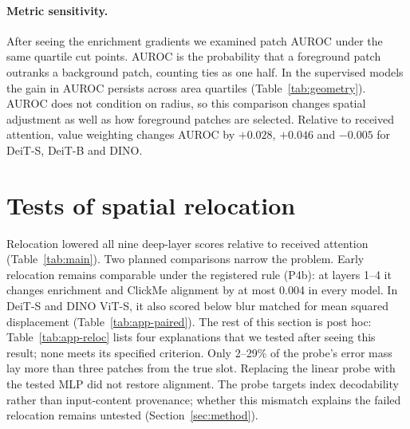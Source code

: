 \paragraph{Metric sensitivity.} After seeing the enrichment gradients we examined patch AUROC under the same quartile cut points. AUROC is the probability that a foreground patch outranks a background patch, counting ties as one half. In the supervised models the gain in AUROC persists across area quartiles (Table~\ref{tab:geometry}). AUROC does not condition on radius, so this comparison changes spatial adjustment as well as how foreground patches are selected. Relative to received attention, value weighting changes AUROC by $+0.028$, $+0.046$ and $-0.005$ for DeiT-S, DeiT-B and DINO.

\begin{center}\begin{minipage}{\linewidth}
\label{tab:geometry}\centering\small
\end{minipage}\end{center}
\clearpage
\section{Tests of spatial relocation}
\label{app:reloc}

Relocation lowered all nine deep-layer scores relative to received attention (Table~\ref{tab:main}). Two planned comparisons narrow the problem. Early relocation remains comparable under the registered rule (P4b): at layers 1--4 it changes enrichment and ClickMe alignment by at most 0.004 in every model. In DeiT-S and DINO ViT-S, it also scored below blur matched for mean squared displacement (Table~\ref{tab:app-paired}). The rest of this section is post hoc: Table~\ref{tab:app-reloc} lists four explanations that we tested after seeing this result; none meets its specified criterion. Only 2--29\% of the probe's error mass lay more than three patches from the true slot. Replacing the linear probe with the tested MLP did not restore alignment. The probe targets index decodability rather than input-content provenance; whether this mismatch explains the failed relocation remains untested (Section~\ref{sec:method}).

\begin{table}[!htbp]
\caption{Four explanations for probe-relocation failure (post hoc). Model order: DeiT-S, DeiT-B, DINO ViT-S. Cells are the two centre-controlled metrics in the three models; criteria and probe settings are defined in this section.}
\label{tab:app-reloc}
\centering

\end{table}

